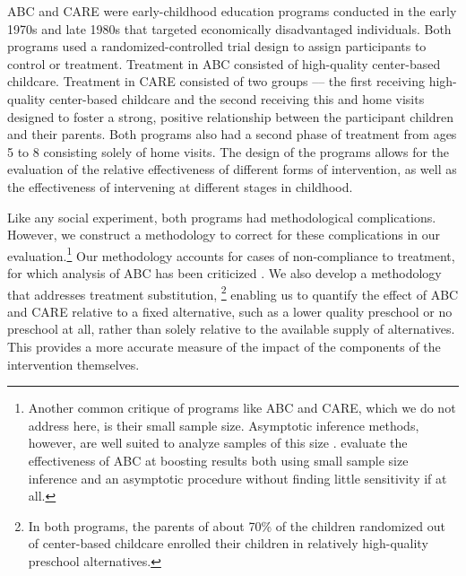 ABC and CARE were early-childhood education programs conducted in the early 1970s and late 1980s that targeted economically disadvantaged individuals. Both programs used a randomized-controlled trial design to assign participants to control or treatment. Treatment in ABC consisted of high-quality center-based childcare. Treatment in CARE consisted of two groups –-- the first receiving high-quality center-based childcare and the second receiving this and home visits designed to foster a strong, positive relationship between the participant children and their parents. Both programs also had a second phase of treatment from ages 5 to 8 consisting solely of home visits. The design of the programs allows for the evaluation of the relative effectiveness of different forms of intervention, as well as the effectiveness of intervening at different stages in childhood.  

Like any social experiment, both programs had methodological complications. However, we construct a methodology to correct for these complications in our evaluation.\footnote{Another common critique of programs like ABC and CARE, which we do not address here, is their small sample size. Asymptotic inference methods, however, are well suited to analyze samples of this size \citep{Hanushek_Lindseth_2009_BOOKSchoolhousesCourthouses}. \citet{Campbell_Conti_etal_2014_EarlyChildhoodInvestments} evaluate the effectiveness of ABC at boosting results both using small sample size inference and an asymptotic procedure without finding little sensitivity if at all.} Our methodology accounts for cases of non-compliance to treatment, for which analysis of ABC has been criticized \citep{Hu_2014_ABC-Study}.
We also develop a methodology that addresses treatment substitution, \footnote{In both programs, the parents of about 70\% of the children randomized out of center-based childcare enrolled their children in relatively high-quality preschool alternatives.} enabling us to quantify the effect of ABC and CARE relative to a fixed alternative, such as a lower quality preschool or no preschool at all, rather than solely relative to the available supply of alternatives. This provides a more accurate measure of the impact of the components of the intervention themselves.

